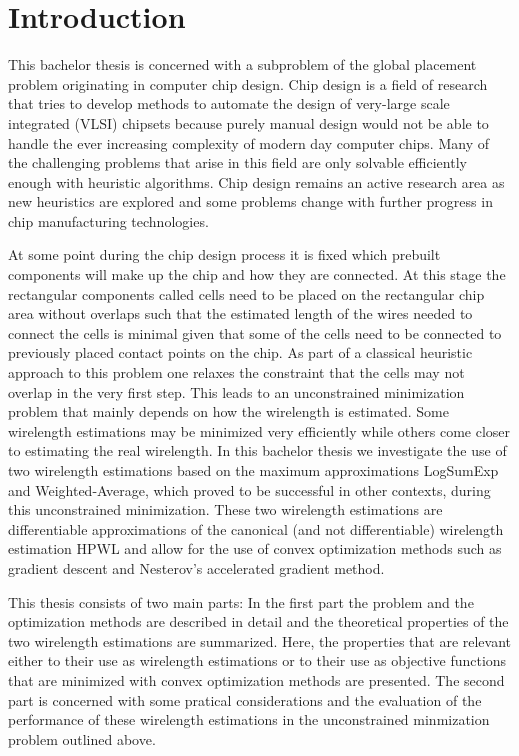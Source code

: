\chapter{Introduction} \label{chap:Introduction}

This bachelor thesis is concerned with a subproblem of the global placement problem originating in computer chip design.
Chip design is a field of research that tries to develop methods to automate the design of very-large scale integrated (VLSI) chipsets
because purely manual design would not be able to handle the ever increasing complexity of modern day computer chips.
Many of the challenging problems that arise in this field are only solvable efficiently enough with heuristic algorithms.
Chip design remains an active research area as new heuristics are explored
and some problems change with further progress in chip manufacturing technologies.

At some point during the chip design process it is fixed which prebuilt components will make up the chip and how they are connected.
At this stage the rectangular components called cells need to be placed on the rectangular chip area without overlaps
such that the estimated length of the wires needed to connect the cells is minimal
given that some of the cells need to be connected to previously placed contact points on the chip.
As part of a classical heuristic approach to this problem one relaxes the constraint that the cells may not overlap in the very first step.
This leads to an unconstrained minimization problem that mainly depends on how the wirelength is estimated.
Some wirelength estimations may be minimized very efficiently while others come closer to estimating the real wirelength.
In this bachelor thesis we investigate the use of two wirelength estimations
based on the maximum approximations LogSumExp and Weighted-Average,
which proved to be successful in other contexts, during this unconstrained minimization.
These two wirelength estimations are differentiable approximations of the canonical (and not differentiable) wirelength estimation HPWL
and allow for the use of convex optimization methods such as gradient descent and Nesterov's accelerated gradient method.

This thesis consists of two main parts:
In the first part the problem and the optimization methods are described in detail
and the theoretical properties of the two wirelength estimations are summarized.
Here, the properties that are relevant either to their use as wirelength estimations
or to their use as objective functions that are minimized with convex optimization methods
are presented.
The second part is concerned with some pratical considerations
and the evaluation of the performance of these wirelength estimations
in the unconstrained minmization problem outlined above.
